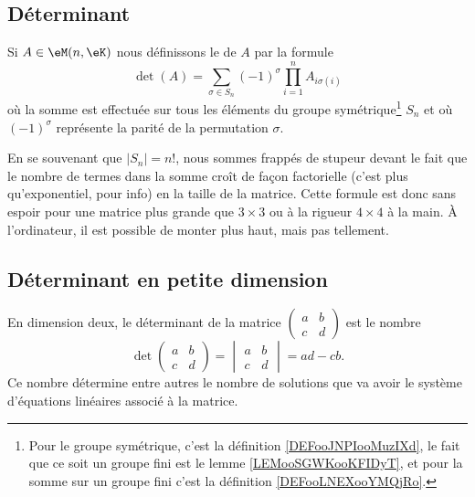 \subsection{Déterminant}

\begin{definition}      \label{DEFooYCKRooTrajdP}
	Si \( A\in\eM(n,\eK)\) nous définissons le  de \( A\) par la formule
	\begin{equation}
		\det(A)=\sum_{\sigma\in S_n}(-1)^{\sigma}\prod_{i=1}^nA_{i\sigma(i)}
	\end{equation}
	où la somme est effectuée sur tous les éléments du groupe symétrique\footnote{Pour le groupe symétrique, c'est la définition \ref{DEFooJNPIooMuzIXd}, le fait que ce soit un groupe fini est le lemme \ref{LEMooSGWKooKFIDyT}, et pour la somme sur un groupe fini c'est la définition \ref{DEFooLNEXooYMQjRo}.} \( S_n\) et où \( (-1)^{\sigma}\) représente la parité de la permutation \( \sigma\).
\end{definition}
En se souvenant que \( | S_n |=n!\), nous sommes frappés de stupeur devant le fait que le nombre de termes dans la somme croît de façon factorielle (c'est plus qu'exponentiel, pour info) en la taille de la matrice. Cette formule est donc sans espoir pour une matrice plus grande que \( 3\times 3\) ou à la rigueur \( 4\times 4\) à la main. À l'ordinateur, il est possible de monter plus haut, mais pas tellement.

\subsection{Déterminant en petite dimension}

En dimension deux, le déterminant de la matrice
\( \begin{pmatrix}
		a & b \\
		c & d
	\end{pmatrix}\)
est le nombre
\begin{equation}        \label{EQooQRGVooChwRMd}
	\det\begin{pmatrix}
		a & b \\
		c & d
	\end{pmatrix}=\begin{vmatrix}
		a & b \\
		c & d
	\end{vmatrix}=ad-cb.
\end{equation}
Ce nombre détermine entre autres le nombre de solutions que va avoir le système d'équations linéaires associé à la matrice.

